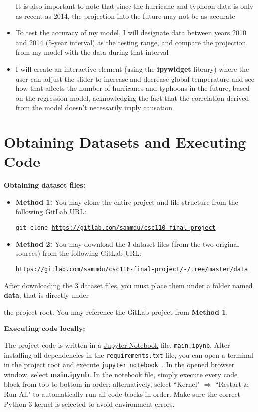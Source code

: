 \documentclass[fontsize=11pt]{article}
\begin{document}
\begin{itemize}
    It is also important to note that since the hurricane and typhoon data is only as recent as 2014, the projection into the future may not be as accurate

    \item To test the accuracy of my model, I will designate data between years 2010 and 2014 (5-year interval) as the testing range, and compare the projection from my model with the data during that interval

    \item I will create an interactive element (using the \textbf{ipywidget} library) where the user can adjust the slider to increase and decrease global temperature and see how that affects the number of hurricanes and typhoons in the future, based on the regression model, acknowledging the fact that the correlation derived from the model doesn't necessarily imply causation
\end{itemize}

\section*{Obtaining Datasets and Executing Code}

\textbf{Obtaining dataset files:}

\begin{itemize}
    \item \textbf{Method 1:} You may clone the entire project and file structure from the following GitLab URL:

    \qquad \texttt{git clone \url{https://gitlab.com/sammdu/csc110-final-project}}

    \item \textbf{Method 2:} You may download the 3 dataset files (from the two original sources) from the following GitLab URL:

    \qquad \texttt{\url{https://gitlab.com/sammdu/csc110-final-project/-/tree/master/data}}
\end{itemize}

After downloading the 3 dataset files, you must place them under a folder named \textbf{data}, that is directly under

the project root. You may reference the GitLab project from \textbf{Method 1}.

\bigskip

\noindent \textbf{Executing code locally:}

\medskip

The project code is written in a \href{https://jupyter.readthedocs.io/en/latest/running.html}{Jupyter Notebook} file, \texttt{main.ipynb}. After installing all dependencies in the \texttt{requirements.txt} file, you can open a terminal in the project root and execute \texttt{jupyter notebook
}. In the opened browser window, select \textbf{main.ipynb}. In the notebook file, simply execute every code block from top to bottom in order; alternatively, select ``Kernel" $\Rightarrow$ ``Restart \& Run All" to automatically run all code blocks in order. Make sure the correct Python 3 kernel is selected to avoid environment errors.
\end{document}
